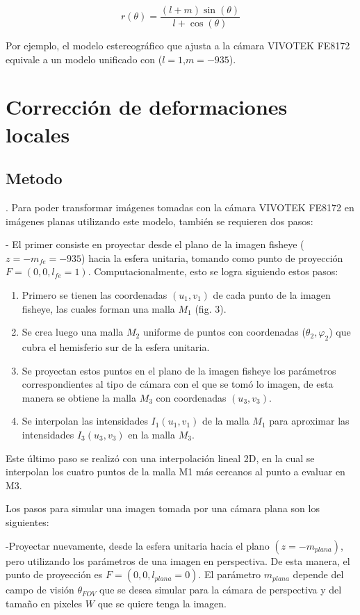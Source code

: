 \documentclass[12pt,a4paper]{article}
\begin{document}
\begin{equation}
  r(\theta) = \frac{(l+m)\sin(\theta)}{l+\cos(\theta)}
\end{equation}

Por ejemplo, el modelo estereográfico que ajusta a la cámara VIVOTEK FE8172 equivale a un modelo unificado con ($l=1$,$m=-935$).


\section{Corrección de deformaciones locales}

\subsection{Metodo}.
Para poder transformar imágenes tomadas con la cámara VIVOTEK FE8172 en imágenes planas utilizando este modelo, también se requieren dos pasos:

- El primer consiste en proyectar desde el plano de la imagen fisheye ($z = -m_{fe} = -935$) hacia la esfera unitaria, tomando como punto de proyección $F = (0, 0, l_{fe} = 1)$.
Computacionalmente, esto se logra siguiendo estos pasos: 


\begin{enumerate}
  \item Primero se tienen las coordenadas $(u_1, v_1)$ de cada punto de la imagen fisheye, las cuales forman una malla $M_1$ (fig. 3).
  \item Se crea luego una malla $M_2$ uniforme de puntos con coordenadas ($\theta_2, \varphi_2$) que cubra el hemisferio sur de la esfera unitaria.
  \item Se proyectan estos puntos en el plano de la imagen fisheye los parámetros correspondientes al tipo de cámara con el que se tomó lo imagen, de esta manera se obtiene la malla $M_3$ con coordenadas $(u_3, v_3)$.
  \item Se interpolan las intensidades $I_1(u_1, v_1)$ de la malla $M_1$ para aproximar las intensidades $I_3(u_3, v_3)$ en la malla $M_3$.
\end{enumerate}

Este último paso se realizó con una interpolación lineal 2D, en la cual se interpolan los cuatro puntos de la malla M1 más cercanos al punto a evaluar en M3. 

Los pasos para simular una imagen tomada por una cámara plana son los siguientes:

-Proyectar nuevamente, desde la esfera unitaria hacia el plano $(z = -m_{plana})$, pero utilizando los parámetros de una imagen en perspectiva. De esta manera, el punto de proyección es $F = (0, 0, l_{plana} = 0)$. El parámetro $m_{plana}$ depende del campo de visión $\theta_{FOV}$ que se desea simular para la cámara de perspectiva y del tamaño en pixeles $W$ que se quiere tenga la imagen.
\end{document}
